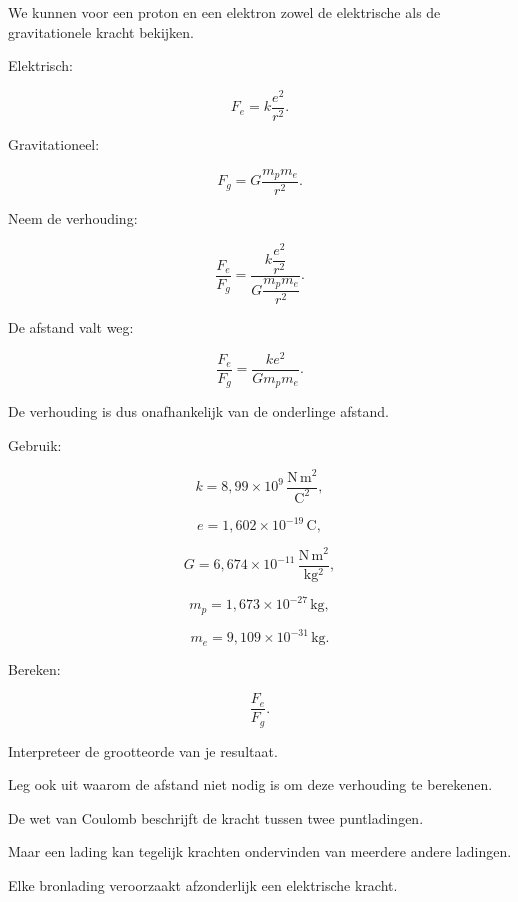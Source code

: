 \documentclass{ximera}
\begin{document}

We kunnen voor een proton en een elektron zowel de elektrische als de
gravitationele kracht bekijken.

Elektrisch:

\[
F_e
=
k\frac{e^2}{r^2}.
\]

Gravitationeel:

\[
F_g
=
G\frac{m_pm_e}{r^2}.
\]

Neem de verhouding:

\[
\frac{F_e}{F_g}
=
\frac{
k\dfrac{e^2}{r^2}
}{
G\dfrac{m_pm_e}{r^2}
}.
\]

De afstand valt weg:

\[
\boxed{
\frac{F_e}{F_g}
=
\frac{ke^2}{Gm_pm_e}.
}
\]

De verhouding is dus onafhankelijk van de onderlinge afstand.


\begin{oefening}{\oefG}

Gebruik:

\[
k=8{,}99\times10^9\,
\frac{\mathrm{N\,m^2}}{\mathrm{C^2}},
\]

\[
e=1{,}602\times10^{-19}\,\mathrm C,
\]

\[
G=6{,}674\times10^{-11}\,
\frac{\mathrm{N\,m^2}}{\mathrm{kg^2}},
\]

\[
m_p=1{,}673\times10^{-27}\,\mathrm{kg},
\]

\[
m_e=9{,}109\times10^{-31}\,\mathrm{kg}.
\]

Bereken:

\[
\frac{F_e}{F_g}.
\]

Interpreteer de grootteorde van je resultaat.

Leg ook uit waarom de afstand niet nodig is om deze verhouding te
berekenen.

\end{oefening}




De wet van Coulomb beschrijft de kracht tussen twee puntladingen.

Maar een lading kan tegelijk krachten ondervinden van meerdere andere
ladingen.

Elke bronlading veroorzaakt afzonderlijk een elektrische kracht.
\end{document}
